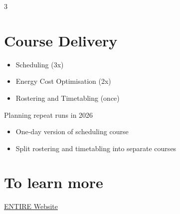 \documentclass[final,hyperref={pdfpagelabels=false}]{beamer}
\begin{document}
\begin{frame}{}
\begin{multicols}{3}
\section{Course Delivery}
\begin{itemize}
\item Scheduling (3x)
\item Energy Cost Optimisation (2x)
\item Rostering and Timetabling (once)
\end{itemize}
Planning repeat runs in 2026
\begin{itemize}
\item One-day version of scheduling course
\item Split rostering and timetabling into separate courses
\end{itemize}


\section{To learn more}
\href{https://entire-edih.ie/}{ENTIRE Website}
\begin{center}
\end{center}



\end{multicols}
\end{frame}
\end{document}
